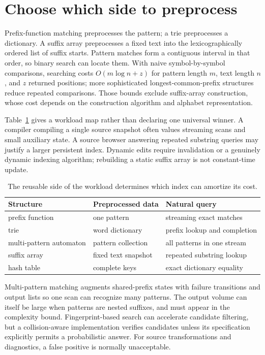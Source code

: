 \section{Choose which side to preprocess}
\label{sec:ch78-indexes}
Prefix-function matching preprocesses the pattern; a trie preprocesses a dictionary.
A suffix array preprocesses a fixed text into the lexicographically ordered list of suffix starts.
Pattern matches form a contiguous interval in that order, so binary search can locate them.
With naive symbol-by-symbol comparisons, searching costs $O(m\log n+z)$ for pattern length $m$, text length $n$, and $z$ returned positions; more sophisticated longest-common-prefix structures reduce repeated comparisons.
Those bounds exclude suffix-array construction, whose cost depends on the construction algorithm and alphabet representation.

Table~\ref{tab:ch78-indexes} gives a workload map rather than declaring one universal winner.
A compiler compiling a single source snapshot often values streaming scans and small auxiliary state.
A source browser answering repeated substring queries may justify a larger persistent index.
Dynamic edits require invalidation or a genuinely dynamic indexing algorithm; rebuilding a static suffix array is not constant-time update.

\begin{table}[htbp]
\caption{The reusable side of the workload determines which index can amortize its cost.}
\label{tab:ch78-indexes}
\centering
\begin{tabular}{lll}
\toprule
Structure & Preprocessed data & Natural query \\
\midrule
prefix function & one pattern & streaming exact matches \\
trie & word dictionary & prefix lookup and completion \\
multi-pattern automaton & pattern collection & all patterns in one stream \\
suffix array & fixed text snapshot & repeated substring lookup \\
hash table & complete keys & exact dictionary equality \\
\bottomrule
\end{tabular}
\end{table}

Multi-pattern matching augments shared-prefix states with failure transitions and output lists so one scan can recognize many patterns.
The output volume can itself be large when patterns are nested suffixes, and must appear in the complexity bound.
Fingerprint-based search can accelerate candidate filtering, but a collision-aware implementation verifies candidates unless its specification explicitly permits a probabilistic answer.
For source transformations and diagnostics, a false positive is normally unacceptable.

